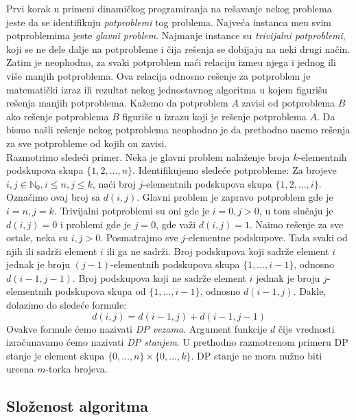 \documentclass[a4paper,12pt]{article}
\numberwithin{equation}{subsection}
\begin{document}
Prvi korak u primeni dinami\v ckog programiranja na re\v savanje nekog problema jeste da se identifikuju \textit{potproblemi} tog problema. Najve\' ca instanca me\dj u svim potproblemima jeste \textit{glavni problem}. Najmanje instance su \textit{trivijalni potproblemi}, koji se ne dele dalje na potprobleme i \v cija re\v senja se dobijaju na neki drugi na\v cin. Zatim je neophodno, za svaki potproblem na\' ci relaciju izme\dj u njega i jednog ili vi\v se manjih potproblema. Ova relacija odnosno re\v senje za potproblem je matemati\v cki izraz ili rezultat nekog jednostavnog algoritma u kojem figuri\v su re\v senja manjih potproblema. Ka\v zemo da potproblem $A$ zavisi od potproblema $B$ ako re\v senje potproblema $B$ figuri\v se u izrazu koji je re\v senje potproblema $A$. Da bismo na\v sli re\v senje nekog potproblema neophodno je da prethodno na\dj emo re\v senja za sve potprobleme od kojih on zavisi.
\\

Razmotrimo slede\' ci primer. Neka je glavni problem nala\v zenje broja $k$-elementnih podskupova skupa $\{1, 2, \ldots, n \}$. Identifikujemo slede\' ce potprobleme: Za brojeve $i, j \in \mathbb{N}_0, i \leq n, j \leq k$, na\' ci broj $j$-elementnih podskupova skupa $\{1, 2, \ldots, i \}$. Ozna\v cimo ovaj broj sa $d(i, j)$. Glavni problem je zapravo potproblem gde je $i=n, j=k$. Trivijalni potproblemi su oni gde je $i=0, j>0$, u tom slu\v caju je $d(i, j) = 0$ i problemi gde je $j=0$, gde va\v zi $d(i, j) = 1$. Na\dj imo re\v senje za sve ostale, neka su $i, j > 0$. Posmatrajmo sve $j$-elementne podskupove. Tada svaki od njih ili sadr\v zi element $i$ ili ga ne sadr\v zi. Broj podskupova koji sadr\v ze element $i$ jednak je broju $(j-1)$-elementnih podskupova skupa $\{1, \ldots, i-1 \}$, odnosno $d(i-1, j-1)$. Broj podskupova koji ne sadr\v ze element $i$ jednak je broju $j$-elementnih podskupova skupa od $\{1, \ldots, i-1 \}$, odnosno $d(i-1, j)$. Dakle, dolazimo do slede\' ce formule:
$$
	d(i, j) = d(i-1, j) + d(i-1, j-1)
$$
Ovakve formule \' cemo nazivati \textit{DP vezama}. Argument funkcije $d$ \v cije vrednosti izra\v cunavamo \' cemo nazivati \textit{DP stanjem}. U prethodno razmotrenom primeru DP stanje je element skupa $\{0, \ldots, n\} \times \{0, \ldots, k\}$. DP stanje ne mora nu\v zno biti ure\dj ena $m$-torka brojeva.

\subsection{Slo\v zenost algoritma}
\end{document}
